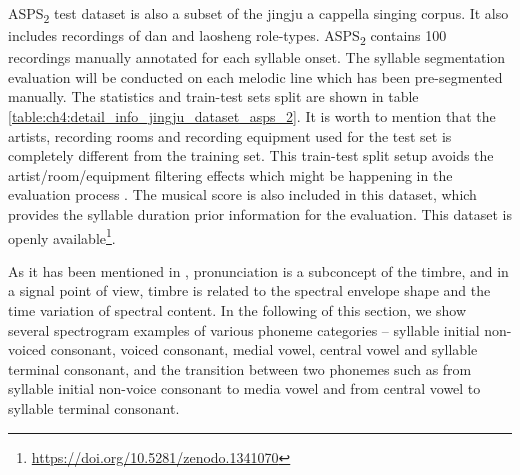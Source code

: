 \gls{ASPS}\textsubscript{2} test dataset is also a subset of the jingju a cappella singing corpus. It also includes recordings of \gls{dan} and \gls{laosheng} role-types. \gls{ASPS}\textsubscript{2} contains 100 recordings manually annotated for each syllable onset. The syllable segmentation evaluation will be conducted on each melodic line which has been pre-segmented manually. The statistics and train-test sets split are shown in table \ref{table:ch4:detail_info_jingju_dataset_asps_2}. It is worth to mention that the artists, recording rooms and recording equipment used for the test set is completely different from the training set. This train-test split setup avoids the artist/room/equipment filtering effects which might be happening in the evaluation process \cite{Flexer2010}. The musical score is also included in this dataset, which provides the syllable duration prior information for the evaluation. This dataset is openly available\footnote{\url{https://doi.org/10.5281/zenodo.1341070}\label{fn:jingju_dataset}}.

As it has been mentioned in , pronunciation is a subconcept of the timbre, and in a signal point of view, timbre is related to the spectral envelope shape and the time variation of spectral content. In the following of this section, we show several spectrogram examples of various phoneme categories -- syllable initial non-voiced consonant, voiced consonant, medial vowel, central vowel and syllable terminal consonant, and the transition between two phonemes such as from syllable initial non-voice consonant to media vowel and from central vowel to syllable terminal consonant.

